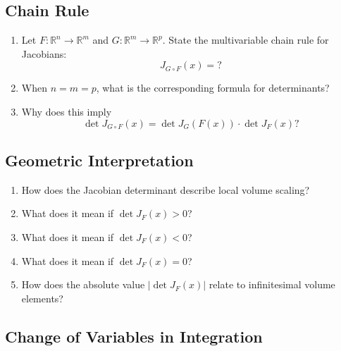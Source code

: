\subsection{Chain Rule}

\begin{enumerate}

\item Let $F : \mathbb{R}^n \to \mathbb{R}^m$ and $G : \mathbb{R}^m \to \mathbb{R}^p$.
  State the multivariable chain rule for Jacobians:
  \[
    J_{G \circ F}(x) = ?
  \]

\item When $n=m=p$, what is the corresponding formula for determinants?

\item Why does this imply
  \[
    \det J_{G \circ F}(x)
    =
    \det J_G(F(x)) \cdot \det J_F(x)?
  \]

\end{enumerate}

\subsection{Geometric Interpretation}

\begin{enumerate}

\item How does the Jacobian determinant describe local volume scaling?

\item What does it mean if $\det J_F(x) > 0$?

\item What does it mean if $\det J_F(x) < 0$?

\item What does it mean if $\det J_F(x) = 0$?

\item How does the absolute value $|\det J_F(x)|$ relate to infinitesimal volume elements?

\end{enumerate}

\subsection{Change of Variables in Integration}

